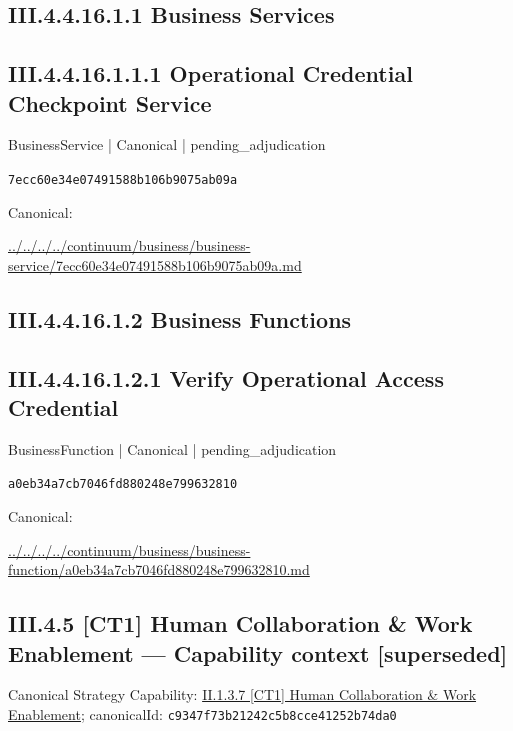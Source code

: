 \documentclass[10pt,a4paper]{article}
\begin{document}
\subsection*{III.4.4.16.1.1 Business Services}
\subsection*{III.4.4.16.1.1.1 Operational Credential Checkpoint Service}
\label{element-7ecc60e34e07491588b106b9075ab09a}
{\small BusinessService | Canonical | pending\_adjudication}\par
\texttt{7ecc60e34e07491588b106b9075ab09a}\par
Canonical: \par
{\footnotesize\url{../../../../continuum/business/business-service/7ecc60e34e07491588b106b9075ab09a.md}}\par
\subsection*{III.4.4.16.1.2 Business Functions}
\subsection*{III.4.4.16.1.2.1 Verify Operational Access Credential}
\label{element-a0eb34a7cb7046fd880248e799632810}
{\small BusinessFunction | Canonical | pending\_adjudication}\par
\texttt{a0eb34a7cb7046fd880248e799632810}\par
Canonical: \par
{\footnotesize\url{../../../../continuum/business/business-function/a0eb34a7cb7046fd880248e799632810.md}}\par
\subsection*{III.4.5 [CT1] Human Collaboration \& Work Enablement — Capability context [superseded]}
Canonical Strategy Capability: \hyperref[element-c9347f73b21242c5b8cce41252b74da0]{II.1.3.7 [CT1] Human Collaboration \& Work Enablement}; canonicalId: \texttt{c9347f73b21242c5b8cce41252b74da0}\par
\end{document}
